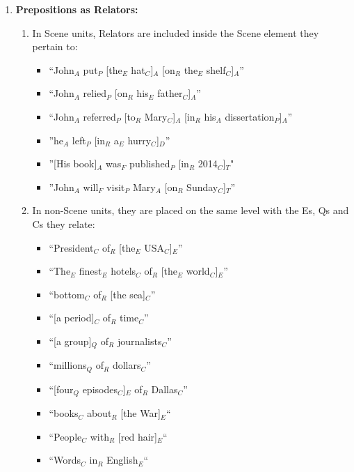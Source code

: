 \documentclass[11pt]{article}
\newcommand{\dd}[1]{{\color{blue}{#1}}}
\newcommand{\oa}[1]{{\color{blue}{OA: #1}}}
\newcommand{\nss}[1]{{\color{magenta}{NSS: #1}}}
\begin{document}
\begin{enumerate}
   
\item
{\bf Prepositions as Relators:}
\begin {enumerate} 
\item
In Scene units, Relators are included inside the Scene element they pertain to: 
\begin {itemize}
	\item
	``John$_A$ put$_P$ [the$_E$ hat$_C$]$_A$ [on$_R$ the$_E$ shelf$_C$]$_A$''
	\item
	``John$_A$ relied$_P$ [on$_R$ his$_E$ father$_C$]$_A$''
	\item
	``John$_A$ referred$_P$ [to$_R$ Mary$_C$]$_A$ [in$_R$ his$_A$ dissertation$_P$]$_A$''
    \item
    ''he$_A$ left$_P$ [in$_R$ a$_E$ hurry$_C$]$_D$''
    \item
    ''[His book]$_A$ was$_F$ published$_P$ [in$_R$ 2014$_C$]$_T$"
    \item
    ''John$_A$ will$_F$ visit$_P$ Mary$_A$ [on$_R$ Sunday$_C$]$_T$''
\end {itemize}

\item  In non-Scene units, they are placed on the same level with the Es, Qs and Cs they relate:
    \begin{itemize}
	\item
	``President$_C$ of$_R$ [the$_E$ USA$_C$]$_E$''
	\item
	``The$_E$ finest$_E$ hotels$_C$ of$_R$ [the$_E$ world$_C$]$_E$''
	\item
	``bottom$_C$ of$_R$ [the sea]$_C$''
	\item
	``[a period]$_C$ of$_R$ time$_C$''
	\item	
	``[a group]$_Q$ of$_R$ journalists$_C$''
	\item
	``millions$_Q$ of$_R$ dollars$_C$''
	\item 
	``[four$_Q$ episodes$_C$]$_E$ of$_R$ Dallas$_C$''
    \item
    ``books$_C$ about$_R$ [the War]$_E$``
    \item
    ``People$_C$ with$_R$ [red hair]$_E$``
    \item 
    ``Words$_C$ in$_R$ English$_E$``
  
    
\end {itemize}
\end{enumerate}


\end{enumerate}
\end{document}
